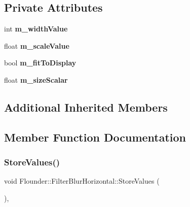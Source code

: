 \subsection*{Private Attributes}
\begin{DoxyCompactItemize}
\item 
\mbox{\label{class_flounder_1_1_filter_blur_horizontal_a2ac20a98617f2f9141bf404ee4ba97f7}} 
int {\bfseries m\+\_\+width\+Value}
\item 
\mbox{\label{class_flounder_1_1_filter_blur_horizontal_a347e5cdc46169343f440cdaaa7f05eca}} 
float {\bfseries m\+\_\+scale\+Value}
\item 
\mbox{\label{class_flounder_1_1_filter_blur_horizontal_aba729021fa09d9425d228e7ce2c0a6e8}} 
bool {\bfseries m\+\_\+fit\+To\+Display}
\item 
\mbox{\label{class_flounder_1_1_filter_blur_horizontal_a33c2df8de953e57cf241a77ad3553e3e}} 
float {\bfseries m\+\_\+size\+Scalar}
\end{DoxyCompactItemize}
\subsection*{Additional Inherited Members}


\subsection{Member Function Documentation}
\mbox{\label{class_flounder_1_1_filter_blur_horizontal_ad08698d066532bee9660cd80c42cac60}} 
\subsubsection{\texorpdfstring{Store\+Values()}{StoreValues()}}
{\footnotesize\ttfamily void Flounder\+::\+Filter\+Blur\+Horizontal\+::\+Store\+Values (\begin{DoxyParamCaption}{ }\end{DoxyParamCaption})\hspace{0.3cm}{\ttfamily [override]}, {\ttfamily [virtual]}}



